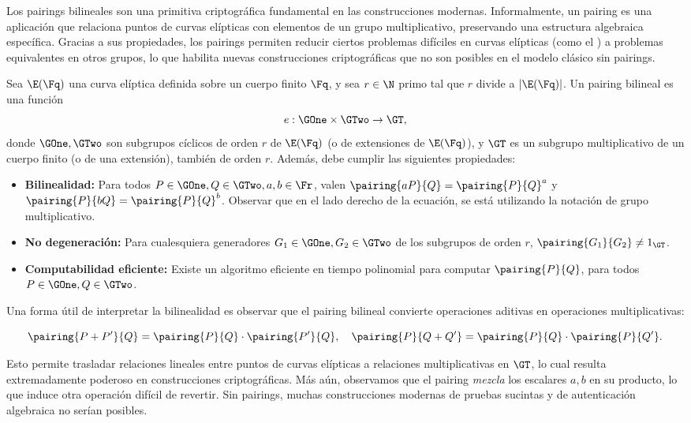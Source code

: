 
Los pairings bilineales son una primitiva criptográfica fundamental en las construcciones modernas. Informalmente, un pairing es una aplicación que relaciona puntos de curvas elípticas con elementos de un grupo multiplicativo, preservando una estructura algebraica específica. Gracias a sus propiedades, los pairings permiten reducir ciertos problemas difíciles en curvas elípticas \cite{Menezes1993} (como el \ECDLP) a problemas equivalentes en otros grupos, lo que habilita nuevas construcciones criptográficas que no son posibles en el modelo clásico sin pairings.

\begin{definition}
	Sea $\E(\Fq)$ una curva elíptica definida sobre un cuerpo finito $\Fq$, y sea $r \in \N$ primo tal que $r$ divide a $|\E(\Fq)|$. Un pairing bilineal es una función
	\[
	e : \GOne \times \GTwo \to \GT,
	\]
	donde $\GOne,\GTwo$ son subgrupos cíclicos de orden $r$ de $\E(\Fq)$ (o de extensiones de $\E(\Fq)$), y $\GT$ es un subgrupo multiplicativo de un cuerpo finito (o de una extensión), también de orden $r$. Además, debe cumplir las siguientes propiedades:
	\begin{itemize}
		\item \textbf{Bilinealidad:} Para todos $P \in \GOne, Q \in \GTwo, a,b \in \Fr$, valen $\pairing{aP}{Q} = \pairing{P}{Q}^a$ y $\pairing{P}{bQ} = \pairing{P}{Q}^b$. Observar que en el lado derecho de la ecuación, se está utilizando la notación de grupo multiplicativo.
		\item \textbf{No degeneración:} Para cualesquiera generadores $G_1 \in \GOne, G_2 \in \GTwo$ de los subgrupos de orden $r$, $\pairing{G_1}{G_2} \neq 1_{\GT}$.
		\item \textbf{Computabilidad eficiente:} Existe un algoritmo eficiente en tiempo polinomial para computar $\pairing{P}{Q}$, para todos $P \in \GOne, Q \in \GTwo$.
	\end{itemize}
\end{definition}

Una forma útil de interpretar la bilinealidad es observar que el pairing bilineal convierte operaciones aditivas en operaciones multiplicativas:

$$\pairing{P + P'}{Q}  = \pairing{P}{Q} \cdot \pairing{P'}{Q}, \quad \pairing{P}{Q + Q'} = \pairing{P}{Q} \cdot \pairing{P}{Q'}.$$

Esto permite trasladar relaciones lineales entre puntos de curvas elípticas a relaciones multiplicativas en $\GT$, lo cual resulta extremadamente poderoso en construcciones criptográficas. Más aún, observamos que el pairing \textit{mezcla} los escalares $a,b$ en su producto, lo que induce otra operación difícil de revertir. Sin pairings, muchas construcciones modernas de pruebas sucintas y de autenticación algebraica no serían posibles.


